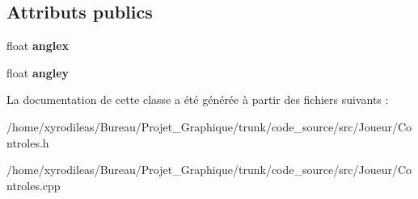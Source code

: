 \subsection*{Attributs publics}
\begin{DoxyCompactItemize}
\item 
\hypertarget{classControles_aafce4f25afb7cb49684dfde3f4c1f5db}{float {\bfseries anglex}}\label{classControles_aafce4f25afb7cb49684dfde3f4c1f5db}

\item 
\hypertarget{classControles_a304b1a6acbc7a488a1576e279696e967}{float {\bfseries angley}}\label{classControles_a304b1a6acbc7a488a1576e279696e967}

\end{DoxyCompactItemize}


La documentation de cette classe a été générée à partir des fichiers suivants \-:\begin{DoxyCompactItemize}
\item 
/home/xyrodileas/\-Bureau/\-Projet\-\_\-\-Graphique/trunk/code\-\_\-source/src/\-Joueur/Controles.\-h\item 
/home/xyrodileas/\-Bureau/\-Projet\-\_\-\-Graphique/trunk/code\-\_\-source/src/\-Joueur/Controles.\-cpp\end{DoxyCompactItemize}
